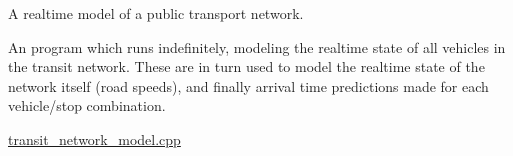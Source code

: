 A realtime model of a public transport network.

An program which runs indefinitely, modeling the realtime state of all vehicles in the transit network. These are in turn used to model the realtime state of the network itself (road speeds), and finally arrival time predictions made for each vehicle/stop combination.


\begin{DoxyItemize}
\item \hyperlink{transit__network__model_8cpp}{transit\+\_\+network\+\_\+model.\+cpp} 
\end{DoxyItemize}